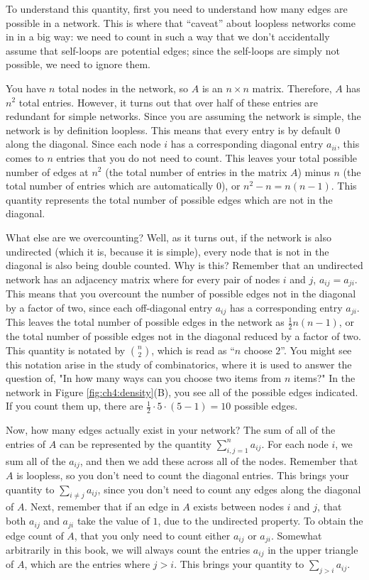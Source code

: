 To understand this quantity, first you need to understand how many edges are possible in a network. This is where that ``caveat'' about loopless networks come in in a big way: we need to count in such a way that we don't accidentally assume that self-loops are potential edges; since the self-loops are simply not possible, we need to ignore them. 

You have $n$ total nodes in the network, so $A$ is an $n \times n$ matrix. Therefore, $A$ has $n^2$ total entries. However, it turns out that over {half} of these entries are redundant for simple networks. Since you are assuming the network is simple, the network is by definition loopless. This means that every entry is {by default} $0$ along the diagonal. Since each node $i$ has a corresponding diagonal entry $a_{ii}$, this comes to $n$ entries that you do not need to count. This leaves your total possible number of edges at $n^2$ (the total number of entries in the matrix $A$) minus $n$ (the total number of entries which are automatically $0$), or $n^2 - n = n(n - 1)$. This quantity represents the total number of possible edges which are {not} in the diagonal.

What else are we overcounting? Well, as it turns out, if the network is also {undirected} (which it is, because it is {simple}), every node that is {not} in the diagonal is also being double counted. Why is this? Remember that an undirected network has an adjacency matrix where for every pair of nodes $i$ and $j$, $a_{ij} = a_{ji}$. This means that you overcount the number of possible edges not in the diagonal by a factor of {two}, since each off-diagonal entry $a_{ij}$ has a corresponding entry $a_{ji}$. This leaves the total number of possible edges in the network as $\frac{1}{2}n(n - 1)$, or the total number of possible edges not in the diagonal reduced by a factor of two. This quantity is notated by $\binom n 2$, which is read as ``$n$ {choose} $2$''. You might see this notation arise in the study of {combinatorics}, where it is used to answer the question of, "In how many ways can you {choose} two items from $n$ items?" In the network in Figure \ref{fig:ch4:density}(B), you see all of the {possible} edges indicated. If you count them up, there are $\frac{1}{2}\cdot 5 \cdot (5 - 1) = 10$ possible edges.

Now, how many edges {actually} exist in your network? The sum of all of the entries of $A$ can be represented by the quantity $\sum_{i , j= 1}^n a_{ij}$. For each node $i$, we sum all of the $a_{ij}$, and then we add these across all of the nodes. Remember that $A$ is loopless, so you don't need to count the diagonal entries. This brings your quantity to $\sum_{i \neq j}a_{ij}$, since you don't need to count any edges along the diagonal of $A$. Next, remember that if an edge in $A$ exists between nodes $i$ and $j$, that {both} $a_{ij}$ and $a_{ji}$ take the value of $1$, due to the undirected property. To obtain the edge count of $A$, that you only need to count {either} $a_{ij}$ {or} $a_{ji}$. Somewhat arbitrarily in this book, we will always count the entries $a_{ij}$ in the upper triangle of $A$, which are the entries where $j > i$. This brings your quantity to $\sum_{j > i} a_{ij}$. 

